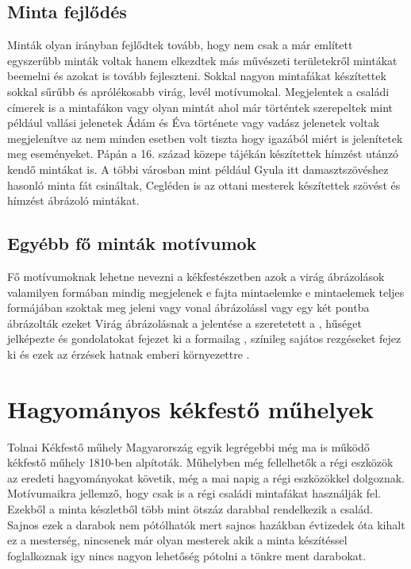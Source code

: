 \documentclass[fontsize=12pt, appendixprefix=true]{scrreprt}
\begin{document}
\subsection{Minta fejlődés}
Minták olyan irányban fejlődtek tovább, hogy nem csak a már említett egyszerűbb minták voltak hanem  elkezdtek más művészeti területekről mintákat beemelni és azokat is tovább fejleszteni.
Sokkal nagyon mintafákat készítettek sokkal sűrűbb és aprólékosabb virág, levél motívumokal. Megjelentek a családi címerek is a mintafákon vagy olyan mintát ahol már történtek szerepeltek mint például vallási jelenetek Ádám és Éva története vagy vadász jelenetek voltak megjelenítve az nem minden esetben volt tiszta hogy igazából miért is jelenítetek meg eseményeket. Pápán a 16. század közepe tájékán  készítettek hímzést utánzó kendő mintákat is. A többi városban mint például Gyula itt damasztszövéshez hasonló minta fát csináltak, Cegléden is az ottani mesterek készítettek szövést és hímzést ábrázoló mintákat.

\subsection{Egyébb fő minták motívumok}

Fő motívumoknak lehetne nevezni a kékfestészetben azok a virág ábrázolások valamilyen formában mindig megjelenek e fajta mintaelemke  
e mintaelemek teljes formájában szoktak  meg jeleni vagy vonal ábrázolássl vagy egy két pontba ábrázolták ezeket 
Virág ábrázolásnak a jelentése a szeretetett a , hűséget jelképezte és gondolatokat fejezet ki a formailag , színileg sajátos rezgéseket fejez ki és ezek az érzések hatnak emberi környezettre .

\section{Hagyományos kékfestő műhelyek}
Tolnai Kékfestő műhely Magyarország  egyik legrégebbi még ma is működő kékfestő műhely 1810-ben alpítoták.
Műhelyben még fellelhetők a régi eszközök az eredeti hagyományokat követik, még a mai napig a régi eszközökkel dolgoznak.
Motívumaikra jellemző, hogy csak is a régi családi mintafákat használják fel.
Ezekből a minta készletből több mint ötszáz darabbal rendelkezik a család.
Sajnos ezek a darabok nem pótólhatók mert sajnos hazákban évtizedek óta kihalt ez a mesterség, nincsenek már olyan mesterek akik a minta készítéssel foglalkoznak igy nincs nagyon lehetőség pótolni a tönkre 
ment darabokat.
\end{document}
